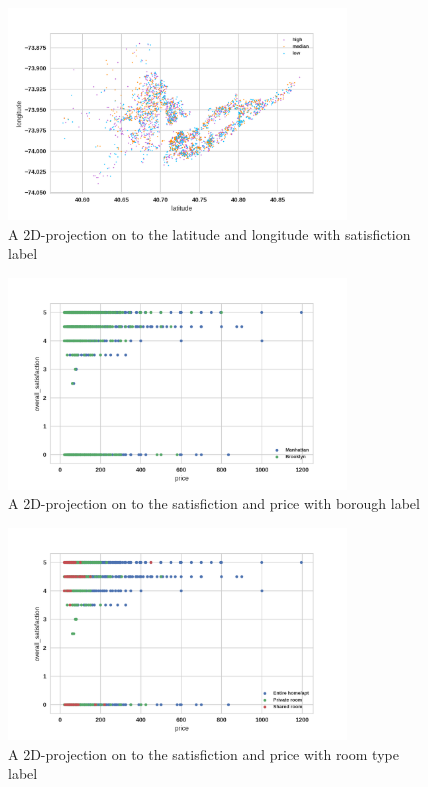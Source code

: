 \documentclass[12pt]{article}
\begin{document}
\begin{figure}[htb]
\centering
\includegraphics[width = 0.8\textwidth]{images/pair-latitude-longitude-satisfiction.png}
\caption{A 2D-projection on to the latitude and longitude with satisfiction label}
\label{fig:pair-latitude-longitude-satisfiction}
\end{figure}
\begin{figure}[htb]
\centering
\includegraphics[width = 0.8\textwidth]{images/pair-over-price1.png}
\caption{A 2D-projection on to the satisfiction and price with borough label}
\label{fig:pair-over-price1}
\end{figure}
\begin{figure}[htb]
\centering
\includegraphics[width = 0.8\textwidth]{images/pair-over-price2.png}
\caption{A 2D-projection on to the satisfiction and price with room type label}
\label{fig:pair-over-price2}
\end{figure}
\end{document}

